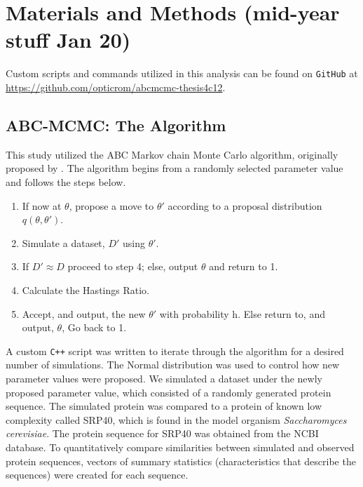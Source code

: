 \documentclass[10pt]{article}
\newcommand{\sclong}{\textit{Saccharomyces cerevisiae}\xspace}
\begin{document}

\section{Materials and Methods (mid-year stuff Jan 20)} 
\label{methods}
Custom scripts and commands utilized in this analysis can be found on \texttt{GitHub} at
\url{https://github.com/opticrom/abcmcmc-thesis4c12}.


\subsection{ABC-MCMC: The Algorithm}

This study utilized the ABC Markov chain Monte Carlo algorithm, originally proposed by \citet{marjoram2003markov}. The algorithm begins from a randomly selected parameter value and follows the steps below.

	\begin{enumerate}
		\item If now at $\theta$, propose a move to $\theta'$ according to a proposal distribution $q(\theta, \theta')$.
		\item Simulate a dataset, $D'$ using $\theta'$.
		\item If $D' \approx D$ proceed to step 4; else, output $\theta$ and return to 1.
		\item Calculate the Hastings Ratio.
		\item Accept, and output, the new $\theta'$ with probability h. Else return to, and output, $\theta$, Go back to 1.
	\end{enumerate}

A custom \texttt{C++} script was written to iterate through the algorithm for a desired number of simulations. The Normal distribution was used to control how new parameter values were proposed. We simulated a dataset under the newly proposed parameter value, which consisted of a randomly generated protein sequence. The simulated protein was compared to a protein of known low complexity called SRP40, which is found in the model organism \sclong. The protein sequence for SRP40 was obtained from the NCBI database. To quantitatively compare similarities between simulated and observed protein sequences, vectors of summary statistics (characteristics that describe the sequences) were created for each sequence. 
\end{document}
